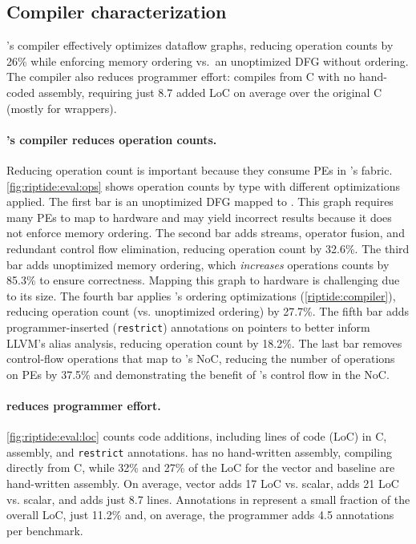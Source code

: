 \figRipTidePrimaryCompilerResults
\figRipTideLoCResults
\subsection{Compiler characterization}
\riptide's compiler effectively optimizes dataflow graphs, reducing operation
counts by 26\% while enforcing memory ordering vs.\ an unoptimized DFG without
ordering.
% 
The compiler also reduces programmer effort: \riptide compiles from C with
no hand-coded assembly, requiring just 8.7 added LoC on average over the original
C (mostly for wrappers).

\paragraph{\riptide's compiler reduces operation counts.} Reducing operation count
is important because they consume PEs in \riptide's fabric.
%
\autoref{fig:riptide:eval:ops} shows operation counts by type with different optimizations applied.
% 
The first bar is an unoptimized DFG mapped to \riptide.
% 
This graph requires many PEs to map to hardware and may yield incorrect
results because it does not enforce memory ordering.
% 
The second bar adds streams, operator fusion, and redundant control flow
elimination, reducing operation count by 32.6\%.
% 
The third bar adds unoptimized memory ordering, which {\em increases} operations counts by 85.3\% to ensure correctness.
% 
Mapping this graph to hardware is challenging due to its size.
% 
The fourth bar applies \riptide's ordering optimizations (\autoref{riptide:compiler}), reducing operation count (vs. unoptimized ordering) by 27.7\%.
% 
The fifth bar adds programmer-inserted ({\tt restrict}) annotations on pointers
to better inform LLVM's alias analysis, reducing operation count by 18.2\%.
% 
The last bar removes control-flow operations that map to \riptide's NoC, reducing
the number of operations on PEs by 37.5\% and demonstrating the benefit of
\riptide's control flow in the NoC.
% 

\paragraph{\riptide reduces programmer effort.}
\autoref{fig:riptide:eval:loc} counts code additions, including lines of code (LoC) in C, assembly, and {\tt restrict} annotations.  
%
\riptide has no hand-written assembly, compiling directly from C, while  32\% and
27\% of the LoC for the vector and \snafu baseline are hand-written assembly.
% 
On average, vector adds 17 LoC vs. scalar, \snafu adds 21 LoC vs. scalar, and
\riptide adds just 8.7 lines.
% 
Annotations in \riptide represent a small fraction of the overall LoC, just 11.2\%
and, on average, the programmer adds 4.5 annotations per benchmark.

